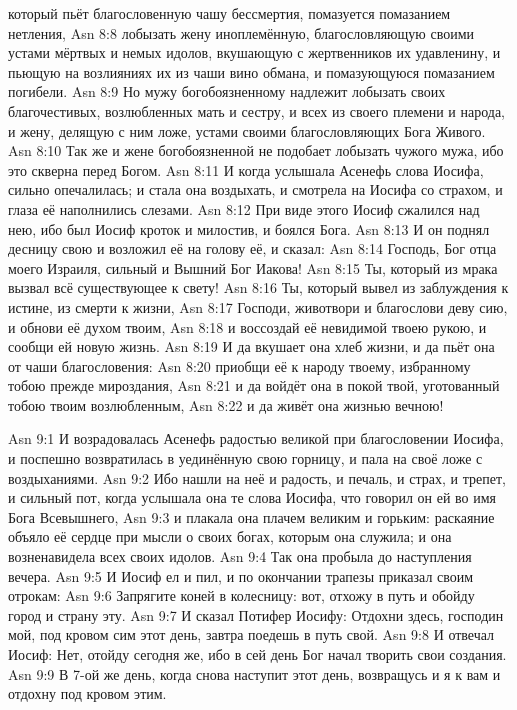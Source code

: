 который пьёт благословенную чашу бессмертия,
помазуется помазанием нетления,
\vs Asn 8:8
лобызать жену иноплемённую,
благословляющую своими устами мёртвых и немых идолов,
вкушающую с жертвенников их удавленину,
и пьющую на возлияниях их из чаши вино обмана,
и помазующуюся помазанием погибели.
\vs Asn 8:9
Но мужу богобоязненному надлежит лобызать
своих благочестивых, возлюбленных мать и сестру,
и всех из своего племени и народа,
и жену, делящую с ним ложе,
устами своими благословляющих Бога Живого.
\vs Asn 8:10
Так же и жене богобоязненной не подобает
лобызать чужого мужа, ибо это скверна перед Богом.
\vs Asn 8:11
И когда услышала Асенефь слова Иосифа,
сильно опечалилась; и стала она воздыхать,
и смотрела на Иосифа со страхом, и глаза её наполнились слезами.
\vs Asn 8:12
При виде этого Иосиф сжалился над нею,
ибо был Иосиф кроток и милостив, и боялся Бога.
\vs Asn 8:13
И он поднял десницу свою и
возложил её на голову её, и сказал:
\vs Asn 8:14
Господь, Бог отца моего
Израиля, сильный и Вышний Бог Иакова!
\vs Asn 8:15
Ты, который из мрака вызвал всё существующее к свету!
\vs Asn 8:16
Ты, который вывел из заблуждения к истине, из смерти к жизни,
\vs Asn 8:17
Господи, животвори и благослови деву сию, и обнови её духом твоим,
\vs Asn 8:18
и воссоздай её невидимой твоею рукою, и сообщи ей новую жизнь.
\vs Asn 8:19
И да вкушает она хлеб жизни, и да пьёт она от чаши благословения:
\vs Asn 8:20
приобщи её к народу твоему,
избранному тобою прежде мироздания,
\vs Asn 8:21
и да войдёт она в покой твой, уготованный тобою твоим возлюбленным,
\vs Asn 8:22
и да живёт она жизнью вечною!

\vs Asn 9:1
И возрадовалась Асенефь радостью великой
при благословении Иосифа,
и поспешно возвратилась в уединённую свою горницу,
и пала на своё ложе с воздыханиями.
\vs Asn 9:2
Ибо нашли на неё и радость,
и печаль, и страх, и трепет,
и сильный пот, когда услышала она те слова Иосифа,
что говорил он ей во имя Бога Всевышнего,
\vs Asn 9:3
и плакала она плачем великим и горьким:
раскаяние объяло её сердце при мысли о своих богах,
которым она служила; и она возненавидела всех своих идолов.
\vs Asn 9:4
Так она пробыла до наступления вечера.
\vs Asn 9:5
И Иосиф ел и пил, и по окончании трапезы приказал своим отрокам:
\vs Asn 9:6
Запрягите коней в колесницу:
вот, отхожу в путь и обойду город и страну эту.
\vs Asn 9:7
И сказал Потифер Иосифу:
Отдохни здесь, господин мой,
под кровом сим этот день, завтра поедешь в путь свой.
\vs Asn 9:8
И отвечал Иосиф:
Нет, отойду сегодня же,
ибо в сей день Бог начал творить свои создания.
\vs Asn 9:9
В 7-ой же день, когда снова наступит этот день,
возвращусь и я к вам и отдохну под кровом этим.

